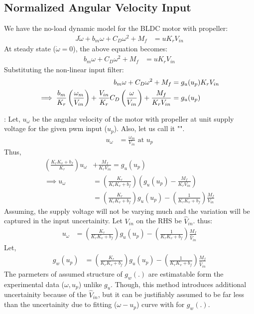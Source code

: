 \subsection{Normalized Angular Velocity Input}

We have the no-load dynamic model for the BLDC motor with propeller:
\begin{align*}
    J \dot \omega + b_m \omega + C_D \omega^2+ M_f &= u K_r V_{in}
\end{align*}
At steady state ($\dot \omega = 0$), the above equation becomes:
\begin{align*}
    b_m \omega + C_D \omega^2 +  M_f &= u K_r V_{in}
\end{align*}
Substituting the non-linear input filter:
\begin{align*}
    b_m \omega + C_D \omega^2 + M_f &= g_u(u_p) K_r V_{in}\\
    \implies \frac{b_m}{K_r} \left(\frac{\omega_m}{V_{in}}\right) + \frac{V_{in}}{K_r} C_D \left( \frac{\omega}{V_{in}} \right) + \frac{M_f}{K_r V_{in}} &= g_u(u_p)
\end{align*}

: Let, $u_{\omega}$ be the angular velocity of the motor with propeller at unit supply voltage for the given pwm input ($u_p$). Also, let us call it "".
\begin{align*}
    u_{\omega} &= \frac{\omega_m}{V_{in}} \text{  at  } u_p
\end{align*}
Thus,
\begin{align*}
    \left(\frac{K_r K_v  + b_f}{K_r} \right) u_{\omega} &+ \frac{M_f}{K_r V_{in}} = g_u(u_p)\\
    \implies u_{\omega} &= \left(\frac{K_r}{K_r K_v  + b_f} \right) \left( g_u(u_p) - \frac{M_f}{K_r V_{in}} \right)\\
    &= \left(\frac{K_r}{K_r K_v  + b_f} \right) g_u(u_p) - \left(\frac{1}{K_r K_v  + b_f} \right) \frac{M_f}{V_{in}}
\end{align*}
Assuming, the supply voltage will not be varying much and the variation will be captured in the input uncertainity. Let $V_{in}$ on the RHS be $\hat V_{in}$. thus:
\begin{align*}
    u_{\omega} &= \left(\frac{K_r}{K_r K_v  + b_f} \right) g_u(u_p) - \left(\frac{1}{K_r K_v  + b_f} \right) \frac{M_f}{\hat V_{in}}
\end{align*}
Let,
\begin{align*}
    g_w (u_p) &= \left(\frac{K_r}{K_r K_v  + b_f} \right) g_u(u_p) - \left(\frac{1}{K_r K_v  + b_f} \right) \frac{M_f}{\hat V_{in}}
\end{align*}
The parmeters of assumed structure of $g_w(.)$ are estimatable form the experimental data ($\omega, u_p$) unlike $g_u$. Though, this method introduces additional uncertainity because of the $\hat V_{in}$, but it can be justifiably assumed to be far less than the uncertainity due to fitting ($\omega-u_p$) curve with for $g_w(.)$.

